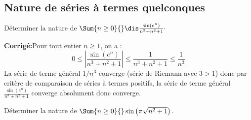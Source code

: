 \documentclass[a4paper,twoside,french,10pt]{VcCours}
\newcommand{\corr}{\textbf{Corrigé:}}
\begin{document}
\medskip

\subsection{Nature de séries à termes quelconques}

\medskip

\begin{Exercice}{} Déterminer la nature de $\Sum{n \geq 0}{} \dis\frac{\sin(e^n)}{n^3+n^2+1} \cdot$
\end{Exercice}

\corr Pour tout entier $n \geq 1$, on a :
\begin{equation}\label{ineg1}
0 \leq \left\vert \frac{\sin(e^n)}{n^3+n^2+1} \right\vert \leq \frac{1}{n^3+n^2+1} \leq \dfrac{1}{n^3}
\end{equation}
La série de terme général $1/n^3$ converge (série de Riemann avec $3>1$) donc par critère de comparaison de séries à termes positifs, la série de terme général $\frac{\sin(e^n)}{n^3+n^2+1}$ converge absolument donc converge.

\medskip

\begin{Exercice}{} Déterminer la nature de $\Sum{n \geq 0}{} \sin \left({\pi \sqrt {n^2 + 1}} \right)$.
\end{Exercice}
\end{document}
